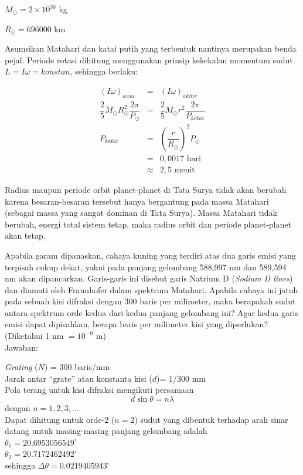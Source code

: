 \documentclass[11pt,fleqn]{exam}
\begin{document}
\begin{questions}
\begin{choices}
$M_{\odot}=2\times10^{30} $ kg

$R_{\odot}=696000 $ km

Asumsikan Matahari dan katai putih yang terbentuk nantinya merupakan benda pejal. Periode rotasi dihitung menggunakan prinsip kekekalan momentum sudut $L=I\omega=konstan$, sehingga berlaku:

\begin{eqnarray*}
(I\omega)_{awal}&=&(I\omega)_{akhir}\\
\dfrac{2}{5}M_{\odot}R_{\odot}^2\dfrac{2\pi}{P_{\odot}}&=&\dfrac{2}{5}M_{\odot}r^2\dfrac{2\pi}{P_{katai}}\\
P_{katai}&=&(\dfrac{r}{R_{\odot}})^2P_{\odot}\\
&=& 0,0017 \text{  hari}\\
&\approx& 2,5 \text{  menit}
\end{eqnarray*}

\choice Radius maupun periode orbit planet-planet di Tata Surya tidak akan berubah karena besaran-besaran tersebut hanya bergantung pada massa Matahari (sebagai massa yang sangat dominan di Tata Surya). Massa Matahari tidak berubah, energi total sistem tetap, maka radius orbit dan periode planet-planet akan tetap.\\
\end{choices}


\question Apabila garam dipanaskan, cahaya kuning yang terdiri atas dua garis emisi yang terpisah cukup dekat, yakni pada panjang gelombang 588,997 nm dan 589,594 nm akan dipancarkan. Garis-garis ini disebut garis Natrium D (\textit{Sodium D lines}) dan diamati oleh Fraunhofer dalam spektrum Matahari. Apabila cahaya ini jatuh pada sebuah kisi difraksi dengan 300 baris per milimeter, maka berapakah sudut antara spektrum orde kedua dari kedua panjang gelombang ini? Agar kedua garis emisi dapat dipisahkan, berapa baris per milimeter kisi yang diperlukan? (Diketahui 1 nm $= 10^{-9}$ m)\\

Jawaban:

\textit{Grating} ($N$) = 300 baris/mm\\
Jarak antar ``grate'' atau konstanta kisi ($d$)= 1/300 mm\\
Pola terang untuk kisi difraksi mengikuti persamaan 
\begin{equation*}
d \sin \theta = n \lambda 
\end{equation*}
dengan $n = 1, 2, 3, ...$\\

Dapat dihitung untuk orde-2 ($n=2$) sudut yang dibentuk terhadap arah sinar datang untuk masing-masing panjang gelombang adalah\\
$\theta_1 = 20.6953056549^{\circ}$\\
$\theta_2 = 20.7172462492^{\circ}$\\
sehingga $\Delta \theta = 0.0219405943^{\circ}$
 

\end{questions}
\end{document}
